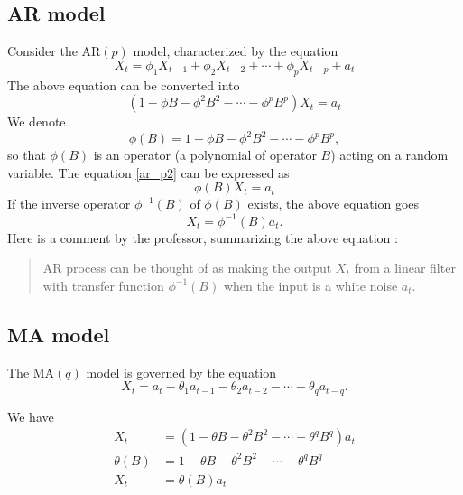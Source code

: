 \documentclass{article}
\newcommand\ar{\ensuremath{\text{AR}}}
\newcommand\ma{\ensuremath{\text{MA}}}
\begin{document}
\subsection{AR model}
Consider the \(\ar(p)\) model, characterized by the equation
\begin{equation}\label{ar_p1}
X_t=\phi_1X_{t-1}+\phi_2X_{t-2}+\cdots+\phi_pX_{t-p}+a_t
\end{equation}
The above equation can be converted into
\begin{equation}\label{ar_p2}
(1-\phi B-\phi^2B^2-\cdots-\phi^pB^p)X_t=a_t
\end{equation}
We denote
\begin{equation}\label{ar_p3}
\phi(B)=1-\phi B-\phi^2B^2-\cdots-\phi^pB^p,
\end{equation}
so that \(\phi(B)\) is an operator (a polynomial of operator \(B\)) acting on a random variable.
The equation \eqref{ar_p2} can be expressed as
\begin{equation}\label{ar_p4}
\phi(B)X_t=a_t
\end{equation}
If the inverse operator \(\phi^{-1}(B)\) of \(\phi(B)\) exists\footnotemark, the above equation goes
\[X_t=\phi^{-1}(B)a_t.\]
Here is a comment by the professor, summarizing the above equation :
\begin{quote}
AR process can be thought of as making the output \(X_t\) from a linear filter with transfer function \(\phi^{-1}(B)\) when the input is a white noise \(a_t\).
\end{quote}

%
\subsection{MA model}
The \(\ma(q)\) model is governed by the equation\footnotemark
\begin{equation}\label{ma_q1}
X_t=a_t-\theta_1a_{t-1}-\theta_2a_{t-2}-\cdots-\theta_qa_{t-q}.
\end{equation}

We have
\begin{align}
X_t&=(1-\theta B-\theta^2B^2-\cdots-\theta^qB^q)a_t
\label{ma_q2}\\
\theta(B)&=1-\theta B-\theta^2B^2-\cdots-\theta^qB^q
\label{ma_q3}\\
X_t&=\theta(B)a_t
\label{ma_q4}
\end{align}
\end{document}
